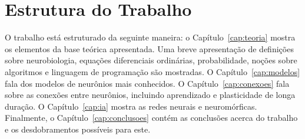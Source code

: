 \section{Estrutura do Trabalho}
O trabalho está estruturado da seguinte maneira: o Capítulo~\ref{cap:teoria} mostra os elementos da base teórica apresentada. Uma breve apresentação de definições sobre neurobiologia, equações diferenciais ordinárias, probabilidade, noções sobre algoritmos e linguagem de programação são mostradas. O Capítulo~\ref{cap:modelos} fala dos modelos de neurônios mais conhecidos. O Capítulo~\ref{cap:conexoes} fala sobre as conexões entre neurônios, incluindo aprendizado e plasticidade de longa duração. O Capítulo~\ref{cap:ia} mostra as redes neurais e neuromórficas.
Finalmente, o Capítulo~\ref{cap:conclusoes} contém as conclusões acerca do trabalho e os desdobramentos possíveis para este.
